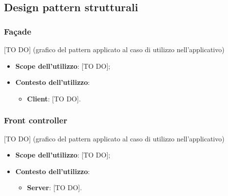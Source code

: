 %


\subsection{Design pattern strutturali} %
\label{sub:design_pattern_strutturali}
	\subsubsection{Fa\c{c}ade} %
	\label{ssub:facade}
	[TO DO] (grafico del pattern applicato al caso di utilizzo nell'applicativo)
		\begin{itemize}
			\item \textbf{Scope dell'utilizzo}: [TO DO];
			\item \textbf{Contesto dell'utilizzo}:
				\begin{itemize}
					\item \textbf{Client}: [TO DO].
				\end{itemize}
		\end{itemize}


	\subsubsection{Front controller} %
	\label{ssub:front_controller}
	[TO DO] (grafico del pattern applicato al caso di utilizzo nell'applicativo)
		\begin{itemize}
			\item \textbf{Scope dell'utilizzo}: [TO DO];
			\item \textbf{Contesto dell'utilizzo}:
				\begin{itemize}
					\item \textbf{Server}: [TO DO].
				\end{itemize}
		\end{itemize}



